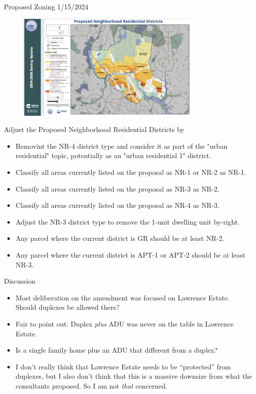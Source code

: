 \documentclass{beamer}
\begin{document}
\begin{frame}{Proposed Zoning 1/15/2024}
    \begin{figure}[htb]
        \centering
        \includegraphics[width=0.8\textwidth,height=0.8\textheight,keepaspectratio]{resources/20240115/proposed_map.png}
    \end{figure}
\end{frame}

\begin{frame}{Adjust the Proposed Neighborhood Residential Districts by}
    \begin{itemize}
        \item Removint the NR-4 district type and consider it as part of the "urban residential" topic, potentially as an "urban residential 1" district.
        \item Classify all areas currently listed on the proposal as NR-1 or NR-2 as NR-1.
        \item Classify all areas currently listed on the proposal as NR-3 as NR-2.
        \item Classify all areas currently listed on the proposal as NR-4 as NR-3.
        \item Adjust the NR-3 district type to remove the 1-unit dwelling unit by-right.
        \item Any parcel where the current district is GR should be at least NR-2.
        \item Any parcel where the current district is APT-1 or APT-2 should be at least NR-3.
    \end{itemize}
\end{frame}

\begin{frame}{Discussion}
  \begin{itemize}
    \item Most deliberation on the amendment was focused on Lawrence Estate. Should duplexes be allowed there? 
    \item Fair to point out: Duplex \textit{plus} ADU was never on the table in Lawrence Estate.
    \item Is a single family home plus an ADU that different from a duplex?
    \item I don't really think that Lawrence Estate needs to be ``protected'' from duplexes, but I also don't think that this is a massive downsize from what the consultants proposed. So I am not \textit{that} concerned.
  \end{itemize}
\end{frame}
\end{document}
